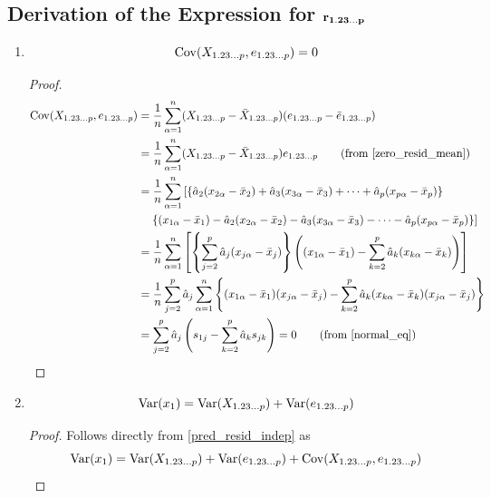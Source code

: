 \documentclass[10pt]{article}
\begin{document}
\subsection{Derivation of the Expression for \(\mathbf{r_{1.23\dots p}}\)}

\begin{enumerate}[1.]
    \item \begin{equation}
		    \operatorname{Cov}(X_{1.23\dots p}, e_{1.23\dots p}) = 0 \label{pred_resid_indep}
    \end{equation}
   \begin{proof}
    \begin{align*}
    \Cov(X_{\regsub}, e_{\regsub}) &= \frac{1}{n} \sum_{\alpha=1}^{n} (X_{\regsub} - \bar{X}_{\regsub})(e_{\regsub} - \bar{e}_{\regsub}) \\
						 &= \frac{1}{n} \sum_{\alpha=1}^{n} (X_{\regsub} - \bar{X}_{\regsub}) e_{\regsub} \tag*{(from \eqref{zero_resid_mean})} \\
    &= \frac{1}{n} \sum_{\alpha=1}^{n} \left[ \{ \hat{a}_2 (x_{2\alpha} - \bar{x}_2) + \hat{a}_3 (x_{3\alpha} - \bar{x}_3) + \dots + \hat{a}_p (x_{p\alpha} - \bar{x}_p) \} \right. \\
    &\quad \left. \{ (x_{1\alpha} - \bar{x}_1) - \hat{a}_2 (x_{2\alpha} - \bar{x}_2) - \hat{a}_3 (x_{3\alpha} - \bar{x}_3) - \dots - \hat{a}_p (x_{p\alpha} - \bar{x}_p) \} \right] \\
    &= \frac{1}{n} \sum_{\alpha=1}^{n} \left[ \left\{ \sum_{j=2}^{p} \hat{a}_j (x_{j\alpha} - \bar{x}_j) \right\} \left( (x_{1\alpha} - \bar{x}_1) - \sum_{k=2}^{p} \hat{a}_k (x_{k\alpha} - \bar{x}_k) \right) \right] \\
    &= \frac{1}{n} \sum_{j=2}^{p} \hat{a}_j \sum_{\alpha=1}^{n} \left\{ (x_{1\alpha} - \bar{x}_1)(x_{j\alpha} - \bar{x}_j) - \sum_{k=2}^{p} \hat{a}_k (x_{k\alpha} - \bar{x}_k)(x_{j\alpha} - \bar{x}_j) \right\} \\
    &= \sum_{j=2}^{p} \hat{a}_j \left( s_{1j} - \sum_{k=2}^{p} \hat{a}_k s_{jk} \right) = 0 \tag*{(from \eqref{normal_eq})}
    \end{align*}
   \end{proof}

\item	\begin{equation}
		\operatorname{Var}(x_{1}) = \operatorname{Var}(X_{1.23\dots p}) + \operatorname{Var}(e_{1.23\dots p}) \label{var_split_eq}
	\end{equation}
	   \begin{proof}
		   Follows directly from \eqref{pred_resid_indep} as
	       \[
		       \operatorname{Var}(x_{1}) = \operatorname{Var}(X_{1.23\dots p}) + \operatorname{Var}(e_{1.23\dots p}) + \operatorname{Cov}(X_{1.23\dots p}, e_{1.23\dots p}) \qedhere
	       \]
	   \end{proof}


\end{enumerate}
\end{document}
